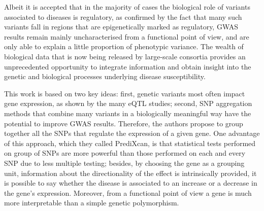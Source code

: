 \documentclass[../main.tex]{subfiles}
\begin{document}
Albeit it is accepted that in the majority of cases the biological role 
of variants associated to diseases is regulatory, as confirmed by the 
fact that many such variants fall in regions that are epigenetically 
marked as regulatory, GWAS results remain mainly uncharacterised from a 
functional point of view, and are only able to explain a little 
proportion of phenotypic variance. The wealth of biological data that is 
now being released by large-scale consortia provides an unprecedented 
opportunity to integrate information and obtain insight into the genetic 
and biological processes underlying disease susceptibility.

This work is based on two key ideas: first, genetic variants most often 
impact gene expression, as shown by the many eQTL studies; second, SNP 
aggregation methods that combine many variants in a biologically 
meaningful way have the potential to improve GWAS results. Therefore, 
the authors propose to group together all the SNPs that regulate the 
expression of a given gene. One advantage of this approach, which they 
called PrediXcan, is that statistical tests performed on group of SNPs 
are more powerful than those performed on each and every SNP due to less 
multiple testing; besides, by choosing the gene as a grouping unit, 
information about the directionality of the effect is intrinsically 
provided, \ie it is possible to say whether the disease is associated to 
an increase or a decrease in the gene's expression. Moreover, from a 
functional point of view a gene is much more interpretable than a simple 
genetic polymorphism.
\end{document}
